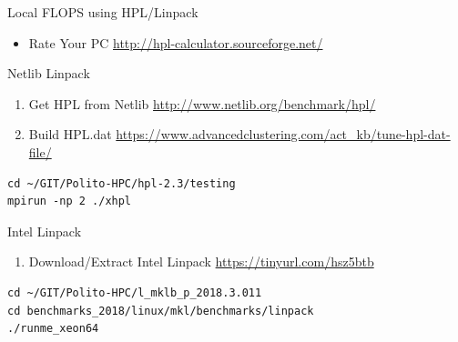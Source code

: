 \documentclass[ignorenonframetext,]{beamer}
\providecommand{\tightlist}{%
  \setlength{\itemsep}{0pt}\setlength{\parskip}{0pt}}
\begin{document}
\begin{frame}[fragile]{Local FLOPS using HPL/Linpack}

\begin{itemize}
\tightlist
\item
  Rate Your PC \url{http://hpl-calculator.sourceforge.net/}
\end{itemize}

\begin{block}{Netlib Linpack}


\begin{enumerate}
\tightlist
\item
  Get HPL from Netlib \url{http://www.netlib.org/benchmark/hpl/}
\item
  Build HPL.dat
  \url{https://www.advancedclustering.com/act_kb/tune-hpl-dat-file/}
\end{enumerate}

\begin{verbatim}
cd ~/GIT/Polito-HPC/hpl-2.3/testing
mpirun -np 2 ./xhpl
\end{verbatim}

\end{block}

\begin{block}{Intel Linpack}

\begin{enumerate}
\tightlist
\item
  Download/Extract Intel Linpack
  \href{https://software.intel.com/en-us/articles/intel-mkl-benchmarks-suite}{https://tinyurl.com/hsz5btb}
\end{enumerate}

\begin{verbatim}
cd ~/GIT/Polito-HPC/l_mklb_p_2018.3.011
cd benchmarks_2018/linux/mkl/benchmarks/linpack
./runme_xeon64
\end{verbatim}


\end{block}

\end{frame}
\end{document}
